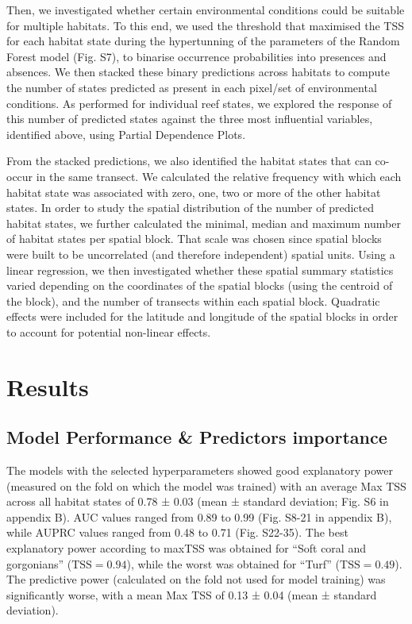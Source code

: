 \begin{refsection}
Then, we investigated whether certain environmental conditions could be
suitable for multiple habitats. To this end, we used the threshold that
maximised the TSS for each habitat state during the hypertunning of the
parameters of the Random Forest model (Fig. S7), to binarise occurrence
probabilities into presences and absences. We then stacked these binary
predictions across habitats to compute the number of states predicted as
present in each pixel/set of environmental conditions. As performed for
individual reef states, we explored the response of this number of
predicted states against the three most influential variables,
identified above, using Partial Dependence Plots.

From the stacked predictions, we also identified the habitat states that
can co-occur in the same transect. We calculated the relative frequency
with which each habitat state was associated with zero, one, two or more
of the other habitat states. In order to study the spatial distribution
of the number of predicted habitat states, we further calculated the
minimal, median and maximum number of habitat states per spatial block.
That scale was chosen since spatial blocks were built to be uncorrelated
(and therefore independent) spatial units. Using a linear regression, we
then investigated whether these spatial summary statistics varied
depending on the coordinates of the spatial blocks (using the centroid
of the block), and the number of transects within each spatial block.
Quadratic effects were included for the latitude and longitude of the
spatial blocks in order to account for potential non-linear effects.

\clearpage

\hypertarget{results-chapt3}{%
\section{Results}\label{results-chapt3}}

\hypertarget{model-performance-predictors-importance}{%
\subsection{Model Performance \& Predictors
importance}\label{model-performance-predictors-importance}}

The models with the selected hyperparameters showed good explanatory
power (measured on the fold on which the model was trained) with an
average Max TSS across all habitat states of 0.78 ± 0.03 (mean ±
standard deviation; Fig. S6 in appendix B). AUC values ranged from 0.89
to 0.99 (Fig. S8-21 in appendix B), while AUPRC values ranged from 0.48
to 0.71 (Fig. S22-35). The best explanatory power according to maxTSS
was obtained for ``Soft coral and gorgonians'' (\(\text{TSS}=0.94\)),
while the worst was obtained for ``Turf'' (\(\text{TSS}=0.49\)). The
predictive power (calculated on the fold not used for model training)
was significantly worse, with a mean Max TSS of 0.13 ± 0.04 (mean ±
standard deviation).


\end{refsection}
